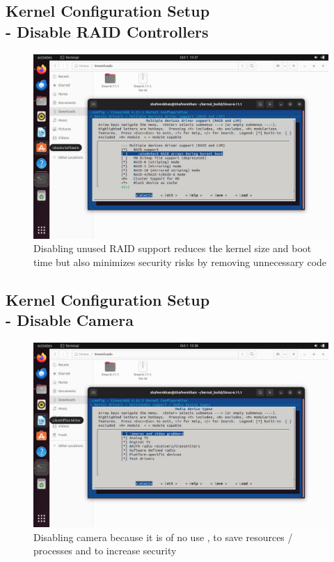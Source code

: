\documentclass{article}
\begin{document}
\subsection{Kernel Configuration Setup \\-  Disable  RAID Controllers}
\begin{figure}[H]
    \centering
    \includegraphics[width=0.8\linewidth]{45.jpg}
    \caption{Disabling unused RAID support reduces the kernel size and boot time but also minimizes security risks by removing unnecessary code}
\end{figure}

\subsection{Kernel Configuration Setup \\-  Disable  Camera}
\begin{figure}[H]
    \centering
    \includegraphics[width=0.8\linewidth]{44.jpg}
    \caption{Disabling camera because it is of no use , to save resources / processes and to increase security}
\end{figure}
\end{document}
